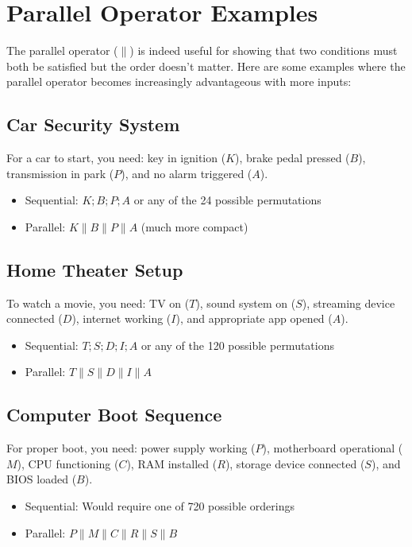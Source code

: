 
\section{Parallel Operator Examples}
\label{app:examples-of-parallel}
The parallel operator ($\|$) is indeed useful for showing that two conditions must both be satisfied but the order doesn't matter. Here are some examples where the parallel operator becomes increasingly advantageous with more inputs:

\subsection*{Car Security System}
For a car to start, you need: key in ignition ($K$), brake pedal pressed ($B$), transmission in park ($P$), and no alarm triggered ($A$).
\begin{itemize}
    \item Sequential: $K;B;P;A$ or any of the 24 possible permutations
    \item Parallel: $K\|B\|P\|A$ (much more compact)
\end{itemize}

\subsection*{Home Theater Setup}
To watch a movie, you need: TV on ($T$), sound system on ($S$), streaming device connected ($D$), internet working ($I$), and appropriate app opened ($A$).
\begin{itemize}
    \item Sequential: $T;S;D;I;A$ or any of the 120 possible permutations
    \item Parallel: $T\|S\|D\|I\|A$
\end{itemize}

\subsection*{Computer Boot Sequence}
For proper boot, you need: power supply working ($P$), motherboard operational ($M$), CPU functioning ($C$), RAM installed ($R$), storage device connected ($S$), and BIOS loaded ($B$).
\begin{itemize}
    \item Sequential: Would require one of 720 possible orderings
    \item Parallel: $P\|M\|C\|R\|S\|B$
\end{itemize}

